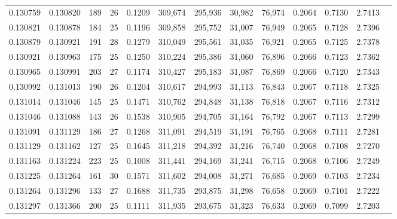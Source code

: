 \begin{tabular}{rrrrrrrrrrrrr}
0.130759 & 0.130820 & 189 &  26 &                                     0.1209 & 309,674 & 295,936 &  30,982 &  76,974 & 0.2064 & 0.7130 & 2.7413 \\
0.130821 & 0.130878 & 184 &  25 &                                     0.1196 & 309,858 & 295,752 &  31,007 &  76,949 & 0.2065 & 0.7128 & 2.7396 \\
0.130879 & 0.130921 & 191 &  28 &                                     0.1279 & 310,049 & 295,561 &  31,035 &  76,921 & 0.2065 & 0.7125 & 2.7378 \\
0.130921 & 0.130963 & 175 &  25 &                                     0.1250 & 310,224 & 295,386 &  31,060 &  76,896 & 0.2066 & 0.7123 & 2.7362 \\
0.130965 & 0.130991 & 203 &  27 &                                     0.1174 & 310,427 & 295,183 &  31,087 &  76,869 & 0.2066 & 0.7120 & 2.7343 \\
0.130992 & 0.131013 & 190 &  26 &                                     0.1204 & 310,617 & 294,993 &  31,113 &  76,843 & 0.2067 & 0.7118 & 2.7325 \\
0.131014 & 0.131046 & 145 &  25 &                                     0.1471 & 310,762 & 294,848 &  31,138 &  76,818 & 0.2067 & 0.7116 & 2.7312 \\
0.131046 & 0.131088 & 143 &  26 &                                     0.1538 & 310,905 & 294,705 &  31,164 &  76,792 & 0.2067 & 0.7113 & 2.7299 \\
0.131091 & 0.131129 & 186 &  27 &                                     0.1268 & 311,091 & 294,519 &  31,191 &  76,765 & 0.2068 & 0.7111 & 2.7281 \\
0.131129 & 0.131162 & 127 &  25 &                                     0.1645 & 311,218 & 294,392 &  31,216 &  76,740 & 0.2068 & 0.7108 & 2.7270 \\
0.131163 & 0.131224 & 223 &  25 &                                     0.1008 & 311,441 & 294,169 &  31,241 &  76,715 & 0.2068 & 0.7106 & 2.7249 \\
0.131225 & 0.131264 & 161 &  30 &                                     0.1571 & 311,602 & 294,008 &  31,271 &  76,685 & 0.2069 & 0.7103 & 2.7234 \\
0.131264 & 0.131296 & 133 &  27 &                                     0.1688 & 311,735 & 293,875 &  31,298 &  76,658 & 0.2069 & 0.7101 & 2.7222 \\
0.131297 & 0.131366 & 200 &  25 &                                     0.1111 & 311,935 & 293,675 &  31,323 &  76,633 & 0.2069 & 0.7099 & 2.7203 \\

\end{tabular}

